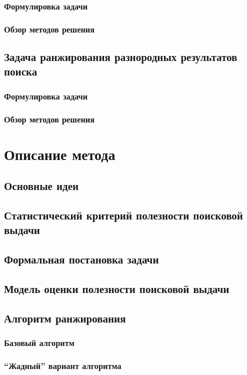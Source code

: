 \documentclass[12pt,a4paper]{report}
\begin{document}
\subsection{Формулировка задачи}
\subsection{Обзор методов решения}

\section{Задача ранжирования разнородных результатов поиска}
\subsection{Формулировка задачи}
\subsection{Обзор методов решения}

\chapter{Описание метода}

\section{Основные идеи}
\section{Статистический критерий полезности поисковой выдачи}
\section{Формальная постановка задачи}
\section{Модель оценки полезности поисковой выдачи}
\section{Алгоритм ранжирования}
\subsection{Базовый алгоритм}
\subsection{``Жадный'' вариант алгоритма}
\end{document}
